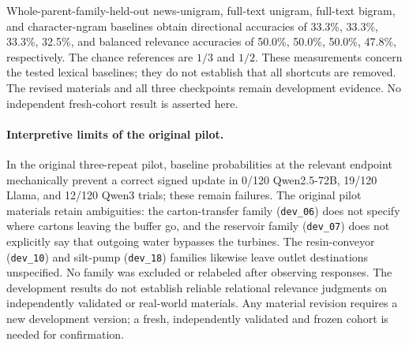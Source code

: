 \begin{center}
\begin{minipage}{\linewidth}
\centering
{}
\label{tab:exp1-robustness-v2-controls}
\small
\resizebox{\linewidth}{!}{}
\end{minipage}
\end{center}

Whole-parent-family-held-out news-unigram, full-text unigram, full-text bigram,
and character-ngram baselines obtain directional accuracies of 33.3\%, 33.3\%, 33.3\%, 32.5\%,
and balanced relevance accuracies of 50.0\%, 50.0\%, 50.0\%, 47.8\%, respectively. The chance
references are $1/3$ and $1/2$. These measurements concern the tested lexical
baselines; they do not establish that all shortcuts are removed. The revised
materials and all three checkpoints remain development evidence. No independent
fresh-cohort result is asserted here.

\paragraph{Interpretive limits of the original pilot.}
In the original three-repeat pilot, baseline probabilities at the relevant endpoint mechanically prevent a correct
signed update in 0/120 Qwen2.5-72B, 19/120 Llama, and 12/120 Qwen3 trials; these
remain failures. The original pilot materials retain ambiguities: the carton-transfer family
(\texttt{dev\_06}) does not specify where cartons leaving the buffer go, and the
reservoir family (\texttt{dev\_07}) does not explicitly say that outgoing water
bypasses the turbines. The resin-conveyor (\texttt{dev\_10}) and silt-pump
(\texttt{dev\_18}) families likewise leave outlet destinations unspecified. No family was excluded or relabeled after observing
responses. The development results do not establish reliable relational relevance
judgments on independently validated or real-world materials. Any material revision requires a new development version; a fresh,
independently validated and frozen cohort is needed for confirmation.

